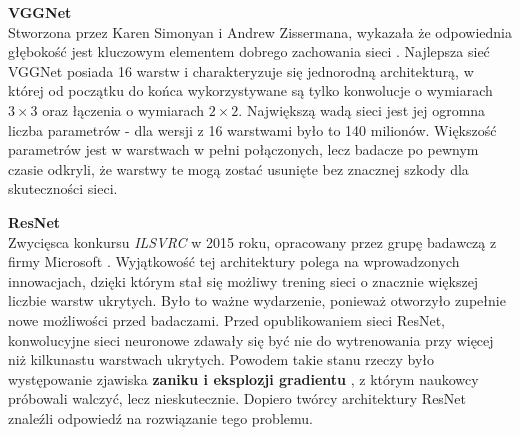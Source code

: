 \begin{enumerate*}
\item \textbf{VGGNet} \\
Stworzona przez Karen Simonyan i Andrew Zissermana, wykazała że odpowiednia głębokość jest kluczowym elementem dobrego zachowania sieci \cite{vggNet:article}. Najlepsza sieć VGGNet posiada 16 warstw i charakteryzuje się jednorodną architekturą, w której od początku do końca wykorzystywane są tylko konwolucje o wymiarach $3 \times 3$ oraz łączenia o wymiarach $2 \times 2$.  Największą wadą sieci jest jej ogromna liczba parametrów - dla wersji z 16 warstwami było to 140 milionów. Większość parametrów jest w warstwach w pełni połączonych, lecz badacze po pewnym czasie odkryli, że warstwy te mogą zostać usunięte bez znacznej szkody dla skuteczności sieci.
\item \textbf{ResNet} \\
Zwycięsca konkursu \textit{ILSVRC} w 2015 roku, opracowany przez grupę badawczą z firmy Microsoft \cite{resnet:article}. Wyjątkowość tej architektury polega na wprowadzonych innowacjach, dzięki którym stał się możliwy trening sieci o znacznie większej liczbie warstw ukrytych. Było to ważne wydarzenie, ponieważ otworzyło zupełnie nowe możliwości przed badaczami. Przed opublikowaniem sieci ResNet, konwolucyjne sieci neuronowe zdawały się być nie do wytrenowania przy więcej niż kilkunastu warstwach ukrytych. Powodem takie stanu rzeczy było występowanie zjawiska \textbf{zaniku i eksplozji gradientu} \cite{bohra:vanishingGradient}, z którym naukowcy próbowali walczyć, lecz nieskutecznie. Dopiero twórcy architektury ResNet znaleźli odpowiedź na rozwiązanie tego problemu.
\end{enumerate*}

